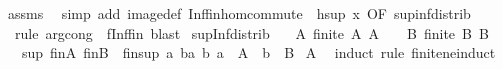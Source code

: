 \begin{isabellebody}
%
\isadelimproof
%
\endisadelimproof
%
\isatagproof
{}\isamarkupfalse%
\ assms\ \isamarkupfalse%
\ {\isacharparenleft}{\kern0pt}simp\ add{\isacharcolon}{\kern0pt}\ image{\isacharunderscore}{\kern0pt}def\ Inf{\isacharunderscore}{\kern0pt}fin{\isachardot}{\kern0pt}hom{\isacharunderscore}{\kern0pt}commute\ {\isacharbrackleft}{\kern0pt}\ h{\isacharequal}{\kern0pt}{\isachardoublequoteopen}sup\ x{\isachardoublequoteclose}{\isacharcomma}{\kern0pt}\ OF\ sup{\isacharunderscore}{\kern0pt}inf{\isacharunderscore}{\kern0pt}distrib{}{\isacharbrackright}{\kern0pt}{\isacharparenright}{\kern0pt}\isanewline
\ \ {\isacharparenleft}{\kern0pt}rule\ arg{\isacharunderscore}{\kern0pt}cong\ {\isacharbrackleft}{\kern0pt}\ f{\isacharequal}{\kern0pt}{\isachardoublequoteopen}Inf{\isacharunderscore}{\kern0pt}fin{\isachardoublequoteclose}{\isacharbrackright}{\kern0pt}{\isacharcomma}{\kern0pt}\ blast{\isacharparenright}{\kern0pt}%
\endisatagproof
{\isafoldproof}%
%
\isadelimproof
\isanewline
%
\endisadelimproof
\isanewline
{}\isamarkupfalse%
\ sup{\isacharunderscore}{\kern0pt}Inf{}{\isacharunderscore}{\kern0pt}distrib{\isacharcolon}{\kern0pt}\isanewline
\ \ \ A{\isacharcolon}{\kern0pt}\ {\isachardoublequoteopen}finite\ A{\isachardoublequoteclose}\ {\isachardoublequoteopen}A\ {\isasymnoteq}\ {\isacharbraceleft}{\kern0pt}{\isacharbraceright}{\kern0pt}{\isachardoublequoteclose}\ \ B{\isacharcolon}{\kern0pt}\ {\isachardoublequoteopen}finite\ B{\isachardoublequoteclose}\ {\isachardoublequoteopen}B\ {\isasymnoteq}\ {\isacharbraceleft}{\kern0pt}{\isacharbraceright}{\kern0pt}{\isachardoublequoteclose}\isanewline
\ \ \ {\isachardoublequoteopen}sup\ {\isacharparenleft}{\kern0pt}{\isasymSqinter}\isactrlsub f\isactrlsub i\isactrlsub nA{\isacharparenright}{\kern0pt}\ {\isacharparenleft}{\kern0pt}{\isasymSqinter}\isactrlsub f\isactrlsub i\isactrlsub nB{\isacharparenright}{\kern0pt}\ {\isacharequal}{\kern0pt}\ {\isasymSqinter}\isactrlsub f\isactrlsub i\isactrlsub n{\isacharbraceleft}{\kern0pt}sup\ a\ b{\isacharbar}{\kern0pt}a\ b{\isachardot}{\kern0pt}\ a\ {\isasymin}\ A\ {\isasymand}\ b\ {\isasymin}\ B{\isacharbraceright}{\kern0pt}{\isachardoublequoteclose}\isanewline
%
\isadelimproof
%
\endisadelimproof
%
\isatagproof
{}\isamarkupfalse%
\ A\ \isamarkupfalse%
\ {\isacharparenleft}{\kern0pt}induct\ rule{\isacharcolon}{\kern0pt}\ finite{\isacharunderscore}{\kern0pt}ne{\isacharunderscore}{\kern0pt}induct{\isacharparenright}{\kern0pt}\isanewline

\end{isabellebody}
